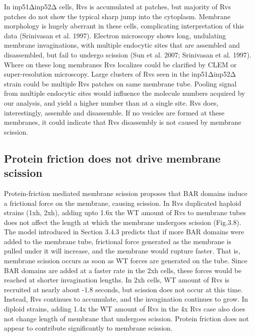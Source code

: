 {In inp51Δinp52Δ cells, Rvs is accumulated at patches, but majority of Rvs patches do not show the typical sharp jump into the cytoplasm. Membrane morphology is hugely aberrant in these cells, complicating interpretation of this data (Srinivasan et al. 1997). Electron microscopy shows long, undulating membrane invaginations, with multiple endocytic sites that are assembled and disassembled, but fail to undergo scission (Sun et al. 2007; Srinivasan et al. 1997). Where on these long membranes Rvs localizes could be clarified by CLEM or super-resolution microscopy. Large clusters of Rvs seen in the inp51Δinp52Δ strain could be multiple Rvs patches on same membrane tube. Pooling signal from multiple endocytic sites would influence the molecule numbers acquired by our analysis, and yield a higher number than at a single site. Rvs does, interestingly, assemble and disassemble. If no vesicles are formed at these membranes, it could indicate that Rvs disassembly is not caused by membrane scission.


\subsection{Protein friction does not drive membrane scission}
Protein-friction mediated membrane scission proposes that BAR domains induce a frictional force on the membrane, causing scission. In Rvs duplicated haploid strains (1xh, 2xh), adding upto 1.6x the WT amount of Rvs to membrane tubes does not affect the length at which the membrane undergoes scission (Fig.3.8). The model introduced in Section 3.4.3 predicts that if more BAR domains were added to the membrane tube, frictional force generated as the membrane is pulled under it will increase, and the membrane would rupture faster. That is, membrane scission occurs as soon as WT forces are generated on the tube. Since BAR domains are added at a faster rate in the 2xh cells, these forces would be reached at shorter invagination lengths. In 2xh cells, WT amount of Rvs is recruited at nearly about -1.8 seconds, but scission does not occur at this time. Instead, Rvs continues to accumulate, and the invagination continues to grow. In diploid strains, adding 1.4x the WT amount of Rvs in the 4x Rvs case also does not change length of membrane that undergoes scission. Protein friction does not appear to contribute significantly to membrane scission. 


}
